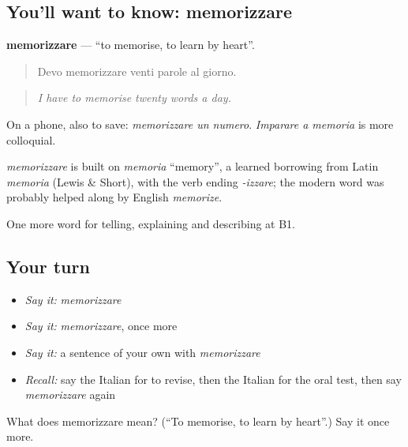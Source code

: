 \subsection*{You'll want to know: memorizzare}
\textbf{memorizzare} — \textquotedblleft{}to memorise, to learn by heart\textquotedblright{}.

\begin{quote}
Devo memorizzare venti parole al giorno.
\end{quote}

\begin{quote}
\emph{I have to memorise twenty words a day.}
\end{quote}

On a phone, also to save: \emph{memorizzare un numero}. \emph{Imparare a memoria} is more colloquial.

\begin{cousinweb}
\emph{memorizzare} is built on \emph{memoria} \textquotedblleft{}memory\textquotedblright{}, a learned borrowing from Latin \emph{memoria} (Lewis \& Short), with the verb ending \emph{-izzare}; the modern word was probably helped along by English \emph{memorize}.
\end{cousinweb}

\begin{grammarlens}[title={What you've built}]
One more word for telling, explaining and describing at B1.
\end{grammarlens}

\subsection*{Your turn}
\begin{itemize}
\raggedright
  \item \emph{Say it:} \emph{memorizzare}
  \item \emph{Say it:} \emph{memorizzare}, once more
  \item \emph{Say it:} a sentence of your own with \emph{memorizzare}
  \item \emph{Recall:} say the Italian for to revise, then the Italian for the oral test, then say \emph{memorizzare} again
\end{itemize}

\begin{tcolorbox}[breakable,colback=teal!4,colframe=teal!35!black,title={Before you move on}]
What does memorizzare mean? (\textquotedblleft{}To memorise, to learn by heart\textquotedblright{}.) Say it once more.
\end{tcolorbox}
